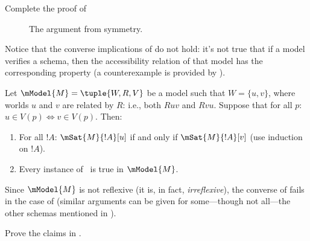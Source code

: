 \documentclass[../../../include/open-logic-section]{subfiles}
\begin{document}
\begin{prob}
  Complete the proof of 
\end{prob}

\begin{figure}
  \begin{center}
  \end{center}
\caption{The argument from symmetry.}
\end{figure}

Notice that the converse implications of  do
not hold: it's not true that if a model verifies a schema, then the
accessibility relation of that model has the corresponding property (a
counterexample is provided by ).

\begin{ex}
  Let $\mModel{M} = \tuple{W, R, V}$ be a model such that $W = \{u, v
  \}$, where worlds $u$ and $v$ are related by $R$: i.e., both $Ruv$
  and $Rvu$.  Suppose that for all $p$: $u \in V(p) \Leftrightarrow v
  \in V(p)$. Then:
  \begin{enumerate}
  \item For all $!A$: $\mSat{M}{!A}[u]$ if and only if
    $\mSat{M}{!A}[v]$ (use induction on $!A$).
  \item Every instance of~ is true in $\mModel{M}$.
  \end{enumerate}
  Since $\mModel{M}$ is not reflexive (it is, in fact,
  \emph{irreflexive}), the converse of 
  fails in the case of  (similar arguments can be given for
  some---though not all---the other schemas mentioned in
  ).
\end{ex}

\begin{prob}
  Prove the claims in .
\end{prob}
\end{document}
